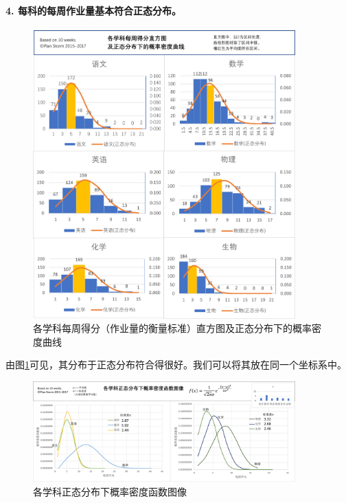 \documentclass[a4paper,12pt]{article}
\begin{document}
\begin{CJK}{UTF8}{song}
\paragraph{4. 每科的每周作业量基本符合正态分布。} 

\begin{figure}[H]
    \centering
    \includegraphics[width=0.9\textwidth]{img/4.png}
    \caption{各学科每周得分（作业量的衡量标准）直方图及正态分布下的概率密度曲线}
    \label{subject}
\end{figure}

由图\ref{subject}可见，其分布于正态分布符合得很好。我们可以将其放在同一个坐标系中。

\begin{figure}[H]
    \centering
    \includegraphics[width=0.9\textwidth]{img/5.png}
    \caption{各学科正态分布下概率密度函数图像}
    \label{var}
\end{figure}


\end{CJK}
\end{document}
